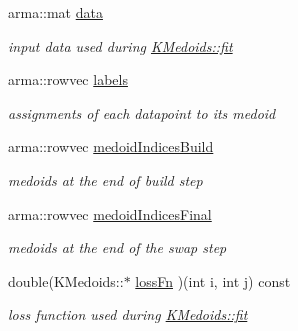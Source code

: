 \begin{DoxyCompactItemize}
\mbox{\label{classKMedoids_afca7201861fc3c605ba25e059cd58764}} 
arma\+::mat \hyperlink{classKMedoids_afca7201861fc3c605ba25e059cd58764}{data}
\begin{DoxyCompactList}\small\item\em input data used during \hyperlink{classKMedoids_ae241800e72a6b4a677333ffbf06e1798}{K\+Medoids\+::fit} \end{DoxyCompactList}\item 
\mbox{\label{classKMedoids_a45310cf654a48d10b5ad5727ad4ef642}} 
arma\+::rowvec \hyperlink{classKMedoids_a45310cf654a48d10b5ad5727ad4ef642}{labels}
\begin{DoxyCompactList}\small\item\em assignments of each datapoint to its medoid \end{DoxyCompactList}\item 
\mbox{\label{classKMedoids_a9e2922bc8e5da2e9c56c993eb8498b32}} 
arma\+::rowvec \hyperlink{classKMedoids_a9e2922bc8e5da2e9c56c993eb8498b32}{medoid\+Indices\+Build}
\begin{DoxyCompactList}\small\item\em medoids at the end of build step \end{DoxyCompactList}\item 
\mbox{\label{classKMedoids_a02da30e8be63abfae08283cfdb0fa36f}} 
arma\+::rowvec \hyperlink{classKMedoids_a02da30e8be63abfae08283cfdb0fa36f}{medoid\+Indices\+Final}
\begin{DoxyCompactList}\small\item\em medoids at the end of the swap step \end{DoxyCompactList}\item 
\mbox{\label{classKMedoids_ad50e4e43b5fac577e38f341ae871b447}} 
double(K\+Medoids\+::$\ast$ \hyperlink{classKMedoids_ad50e4e43b5fac577e38f341ae871b447}{loss\+Fn} )(int i, int j) const
\begin{DoxyCompactList}\small\item\em loss function used during \hyperlink{classKMedoids_ae241800e72a6b4a677333ffbf06e1798}{K\+Medoids\+::fit} \end{DoxyCompactList}\item 
\mbox{\label{classKMedoids_ac36a9e6347281ff72dc3ccd677f8c45a}} 

\end{DoxyCompactItemize}
